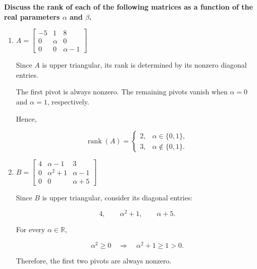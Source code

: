 
\item \textbf{Discuss the rank of each of the following matrices as a function of the real parameters $\alpha$ and $\beta$.}

\begin{enumerate}[label=\alph*)]

    \item
    $A=
    \begin{bmatrix}
        -5 & 1 & 8 \\
         0 & \alpha & 0 \\
         0 & 0 & \alpha-1
    \end{bmatrix}
    $ \\[1.0em]

    \begin{answer}
        Since $A$ is upper triangular, its rank is
        determined by its nonzero diagonal entries.

        The first pivot is always nonzero.
        The remaining pivots vanish when
        $\alpha=0$ and $\alpha=1$, respectively.

        Hence,

        $$
        \boxed{
        \operatorname{rank}(A)=
        \begin{cases}
            2, & \alpha\in\{0,1\},\\
            3, & \alpha\notin\{0,1\}.
        \end{cases}
        }
        $$
    \end{answer}


    \item
    $B=
    \begin{bmatrix}
        4 & \alpha-1 & 3 \\
        0 & \alpha^2+1 & \alpha-1 \\
        0 & 0 & \alpha+5
    \end{bmatrix}
    $ \\[1.0em]

    \begin{answer}
        Since $B$ is upper triangular, consider
        its diagonal entries:

        $$
        4,\qquad \alpha^2+1,\qquad \alpha+5.
        $$

        For every $\alpha\in\mathbb{R}$,

        $$
        \alpha^2\geq0
        \quad\Longrightarrow\quad
        \alpha^2+1\geq1>0.
        $$

        Therefore, the first two pivots
        are always nonzero.


\end{answer}
\end{enumerate}
